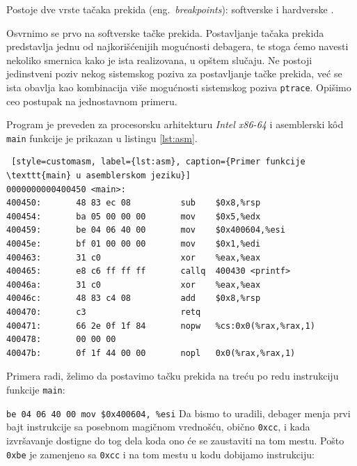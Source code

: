 \documentclass[12pt,oneside]{memoir}
\begin{document}
Postoje dve vrste tačaka prekida (eng.~\emph{breakpoints}): softverske i hardverske \cite{GDB}.

Osvrnimo se prvo na softverske tačke prekida. Postavljanje tačaka prekida predstavlja jednu od najkorišćenijih mogućnosti debagera, te stoga ćemo navesti nekoliko smernica kako je ista realizovana, u opštem slučaju. Ne postoji jedinstveni poziv nekog sistemskog poziva za postavljanje tačke prekida, već se ista obavlja kao kombinacija više mogućnosti  sistemskog poziva \texttt{ptrace}. Opišimo ceo postupak na jednostavnom primeru.

Program je preveden za procesorsku arhitekturu \emph{Intel x86-64} i asemblerski k\^{o}d \texttt{main} funkcije je prikazan u listingu \ref{lst:asm}.\newpage
\begin{lstlisting} [style=customasm, label={lst:asm}, caption={Primer funkcije \texttt{main} u asemblerskom jeziku}]
0000000000400450 <main>:
400450:       48 83 ec 08          sub    $0x8,%rsp
400454:       ba 05 00 00 00       mov    $0x5,%edx
400459:       be 04 06 40 00       mov    $0x400604,%esi
40045e:       bf 01 00 00 00       mov    $0x1,%edi
400463:       31 c0                xor    %eax,%eax
400465:       e8 c6 ff ff ff       callq  400430 <printf>
40046a:       31 c0                xor    %eax,%eax
40046c:       48 83 c4 08          add    $0x8,%rsp
400470:       c3                   retq   
400471:       66 2e 0f 1f 84       nopw   %cs:0x0(%rax,%rax,1)
400478:       00 00 00 
40047b:       0f 1f 44 00 00       nopl   0x0(%rax,%rax,1)

\end{lstlisting}


Primera radi, želimo da postavimo tačku prekida na treću po redu instrukciju funkcije \texttt{main}:

\texttt{be 04 06 40 00  mov \$0x400604, \%esi}\newline
Da bismo to uradili, debager menja prvi bajt instrukcije sa posebnom magičnom vrednošću, obično \texttt{0xcc}, i kada izvršavanje dostigne do tog dela koda ono će se zaustaviti na tom mestu.
Pošto \texttt{0xbe} je zamenjeno sa \texttt{0xcc} i na tom mestu u kodu dobijamo instrukciju:
\end{document}
